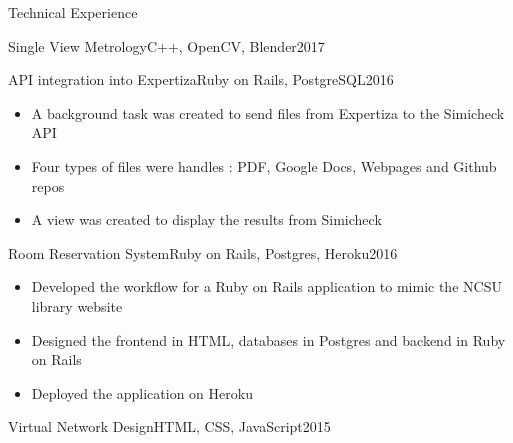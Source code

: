 \documentclass[]{mcdowellcv}
\begin{document}
\begin{cvsection}{Technical Experience}
\begin{cvsubsection}{Single View Metrology}{C++, OpenCV, Blender}{2017}
        \end{cvsubsection}
        
        \begin{cvsubsection}{API integration into Expertiza}{Ruby on Rails, PostgreSQL}{2016}
        
        	\vspace{-.2cm}
            
            \begin{itemize}
            
            	\item A background task was created to send files from Expertiza to the Simicheck API
                \item Four types of files were handles : PDF, Google Docs, Webpages and Github repos
                \item A view was created to display the results from Simicheck

 			\end{itemize}
        
        \end{cvsubsection}
        
        \begin{cvsubsection}{Room Reservation System}{Ruby on Rails, Postgres, Heroku}{2016}
        
        	\vspace{-.3cm}
            
            \begin{itemize}
            
            	\item Developed the workflow for a Ruby on Rails application to mimic the NCSU library website
                \item Designed the frontend in HTML, databases in Postgres and backend in Ruby on Rails
                \item Deployed the application on Heroku
            
            \end{itemize}
        
        \end{cvsubsection}
		
    	\begin{cvsubsection}{Virtual Network Design}{HTML, CSS, JavaScript}{2015}
        
        	\vspace{-.3cm}
        	
            \begin{itemize}
            

\end{itemize}
\end{cvsubsection}
\end{cvsection}
\end{document}
